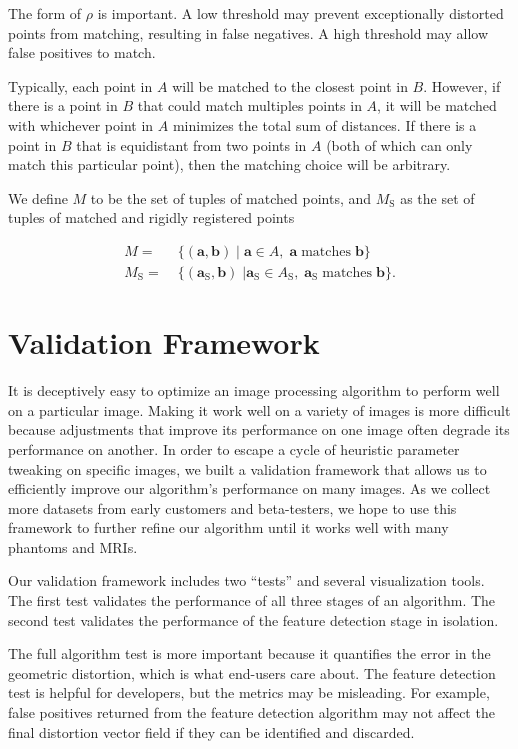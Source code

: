 \documentclass[12pt]{article}
\begin{document}
The form of $\rho$ is important.  A low threshold may prevent exceptionally distorted points from matching, resulting in false negatives.  A high threshold may allow false positives to match.  

Typically, each point in $A$ will be matched to the closest point in $B$. However, if there is a point in $B$ that could match multiples points in $A$, it will be matched with whichever point in $A$ minimizes the total sum of distances.  If there is a point in $B$ that is equidistant from two points in $A$ (both of which can only match this particular point), then the matching choice will be arbitrary.

We define $M$ to be the set of tuples of matched points, and $M_\textrm{S}$ as the set of tuples of matched and rigidly registered points

\begin{align*}
    M =& \; \{ (\mathbf{a}, \mathbf{b}) \; | \; \mathbf{a} \in A, \; \mathbf{a} \; \textrm{matches} \; \mathbf{b} \} \\
    M_\textrm{S} =& \; \{ (\mathbf{a}_\textrm{S}, \mathbf{b}) \; | \mathbf{a}_\textrm{S} \in A_\textrm{S}, \; \mathbf{a}_\textrm{S} \; \textrm{matches} \; \mathbf{b} \}.
\end{align*}

\section{Validation Framework}

It is deceptively easy to optimize an image processing algorithm to perform well on a particular image. Making it work well on a variety of images is more difficult because adjustments that improve its performance on one image often degrade its performance on another.  In order to escape a cycle of heuristic parameter tweaking on specific images, we built a validation framework that allows us to efficiently improve our algorithm's performance on many images.  As we collect more datasets from early customers and beta-testers, we hope to use this framework to further refine our algorithm until it works well with many phantoms and MRIs.

Our validation framework includes two ``tests'' and several visualization tools.  The first test validates the performance of all three stages of an algorithm.  The second test validates the performance of the feature detection stage in isolation.

The full algorithm test is more important because it quantifies the error in the geometric distortion, which is what end-users care about.  The feature detection  test is helpful for developers, but the metrics may be misleading.  For example, false positives returned from the feature detection algorithm may not affect the final distortion vector field if they can be identified and discarded.
\end{document}
